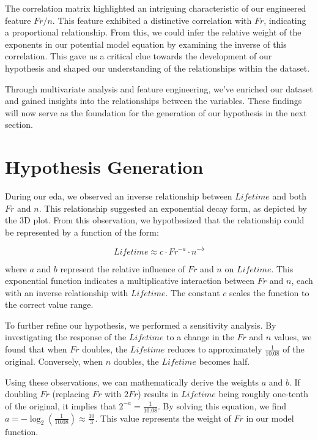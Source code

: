 The correlation matrix highlighted an intriguing characteristic of our engineered feature \(Fr/n\). This feature exhibited a distinctive correlation with \(Fr\), indicating a proportional relationship. From this, we could infer the relative weight of the exponents in our potential model equation by examining the inverse of this correlation. This gave us a critical clue towards the development of our hypothesis and shaped our understanding of the relationships within the dataset.

Through multivariate analysis and feature engineering, we've enriched our dataset and gained insights into the relationships between the variables. These findings will now serve as the foundation for the generation of our hypothesis in the next section.


\section{Hypothesis Generation}

During our \ac{eda}, we observed an inverse relationship between \(Lifetime\) and both \(Fr\) and \(n\). This relationship suggested an exponential decay form, as depicted by the 3D plot. From this observation, we hypothesized that the relationship could be represented by a function of the form:

\begin{equation}
\label{eq:hypothesis}
Lifetime \approx c \cdot Fr^{-a} \cdot n^{-b}
\end{equation}

where \(a\) and \(b\) represent the relative influence of \(Fr\) and \(n\) on \(Lifetime\). This exponential function indicates a multiplicative interaction between \(Fr\) and \(n\), each with an inverse relationship with \(Lifetime\). The constant \(c\) scales the function to the correct value range.

To further refine our hypothesis, we performed a sensitivity analysis. By investigating the response of the \(Lifetime\) to a change in the \(Fr\) and \(n\) values, we found that when \(Fr\) doubles, the \(Lifetime\) reduces to approximately \(\frac{1}{10.08}\) of the original. Conversely, when \(n\) doubles, the \(Lifetime\) becomes half. 

Using these observations, we can mathematically derive the weights \(a\) and \(b\). If doubling \(Fr\) (replacing \(Fr\) with \(2Fr\)) results in \(Lifetime\) being roughly one-tenth of the original, it implies that \(2^{-a} = \frac{1}{10.08}\). By solving this equation, we find \(a = -\log_2(\frac{1}{10.08}) \approx \frac{10}{3}\). This value represents the weight of \(Fr\) in our model function.

